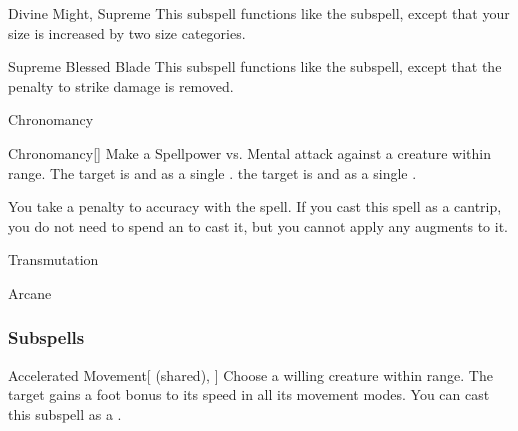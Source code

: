 \begin{ability}[\nth{9}]{Divine Might, Supreme}
This subspell functions like the  subspell, except that your size is increased by two size categories.
\end{ability}
\vspace{0.25em}


\begin{ability}[\nth{9}]{Supreme Blessed Blade}
This subspell functions like the  subspell, except that the penalty to strike damage is removed.
\end{ability}
\vspace{0.25em}

\newpage
\begin{spellsection}{Chronomancy}

\begin{spellheader}
\end{spellheader}


\begin{ability}{Chronomancy}[]
Make a Spellpower vs. Mental attack against a creature within \rngmed range.
\hit The target is  and  as a single .
\crit the target is  and  as a single .
\end{ability}



You take a  penalty to accuracy with the spell.
If you cast this spell as a cantrip,
you do not need to spend an  to cast it,
but you cannot apply any augments to it.


 Transmutation

 Arcane
\end{spellsection}


\subsubsection{Subspells}


\begin{ability}[\nth{1}]{Accelerated Movement}[ (shared), ]
Choose a willing creature within \rngmed range.
The target gains a  foot bonus to its speed in all its movement modes.
You can cast this subspell as a .
\end{ability}
\vspace{0.25em}


